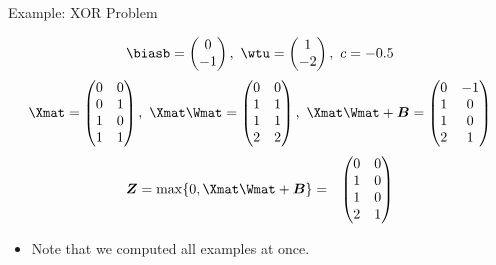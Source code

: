\begin{vbframe}{Example: XOR Problem}
{\begin{eqnarray*}
      \biasb = \begin{pmatrix}
      0 \\
      -1
    \end{pmatrix}, \
      \wtu = \begin{pmatrix}
      1 \\
      -2
    \end{pmatrix}, \
      c = - 0.5
  \end{eqnarray*}
  \begin{eqnarray*}
  \Xmat = \begin{pmatrix}
      0 & 0 \\
      0 & 1 \\
      1 & 0 \\
      1 & 1
    \end{pmatrix}, \
    \Xmat\Wmat = \begin{pmatrix}
      0 & 0 \\
      1 & 1 \\
      1 & 1 \\
      2 & 2
    \end{pmatrix}, \
      \Xmat \Wmat + \bm{B} = \begin{pmatrix}
        0 & -1 \\
        1 & 0 \\
        1 & 0 \\
        2 & 1
    \end{pmatrix}
  \end{eqnarray*}
  \begin{eqnarray*}
    \bm{Z} = \max\{0, \Xmat \Wmat+\bm{B}\}
    &=&
    \begin{pmatrix}
      0 & 0 \\
      1 & 0 \\
      1 & 0 \\
      2 & 1
    \end{pmatrix}
  \end{eqnarray*}
  \begin{itemize}
    \item Note that we computed all examples at once.
  \end{itemize}

}
\end{vbframe}
